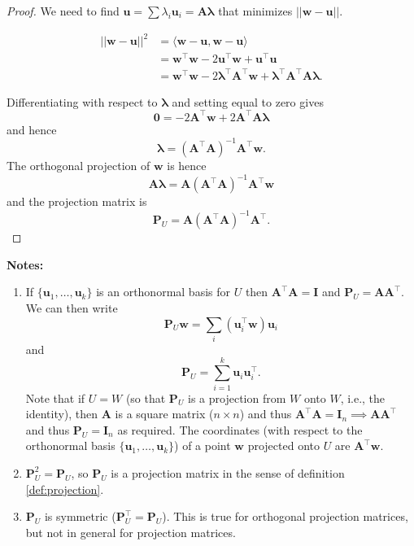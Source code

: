 \documentclass[
]{book}
\theoremstyle{definition}
\theoremstyle{definition}
\theoremstyle{definition}
\theoremstyle{definition}
\theoremstyle{remark}
\begin{document}
\begin{proof}
We need to find \(\mathbf u= \sum \lambda_i \mathbf u_i = \mathbf A\boldsymbol \lambda\) that minimizes \(||\mathbf w-\mathbf u||\).

\begin{align*}
||\mathbf w-\mathbf u||^2 &= \langle \mathbf w-\mathbf u, \mathbf w-\mathbf u\rangle\\
&= \mathbf w^\top \mathbf w- 2\mathbf u^\top \mathbf w+ \mathbf u^\top \mathbf u\\
&= \mathbf w^\top \mathbf w-2\boldsymbol \lambda^\top \mathbf A^\top \mathbf w+ \boldsymbol \lambda^\top \mathbf A^\top \mathbf A\boldsymbol \lambda.
\end{align*}

Differentiating with respect to \(\boldsymbol \lambda\) and setting equal to zero gives
\[{\boldsymbol 0}=-2 \mathbf A^\top \mathbf w+2 \mathbf A^\top \mathbf A\boldsymbol \lambda\]
and hence
\[ \boldsymbol \lambda= (\mathbf A^\top \mathbf A)^{-1}\mathbf A^\top \mathbf w.\]
The orthogonal projection of \(\mathbf w\) is hence
\[ \mathbf A\boldsymbol \lambda= \mathbf A(\mathbf A^\top \mathbf A)^{-1}\mathbf A^\top \mathbf w\]
and the projection matrix is
\[\mathbf P_U = \mathbf A(\mathbf A^\top \mathbf A)^{-1}\mathbf A^\top. \]
\end{proof}

\textbf{Notes:}

\begin{enumerate}
\def\labelenumi{\arabic{enumi}.}
\item
  If \(\{\mathbf u_1, \ldots, \mathbf u_k\}\) is an orthonormal basis for \(U\) then \(\mathbf A^\top \mathbf A= \mathbf I\) and \(\mathbf P_U = \mathbf A\mathbf A^\top\). We can then write
  \[\mathbf P_U\mathbf w= \sum_i (\mathbf u_i^\top \mathbf w) \mathbf u_i\]
  and
  \[\mathbf P_U = \sum_{i=1}^k \mathbf u_i\mathbf u_i^\top.\]
  Note that if \(U=W\) (so that \(\mathbf P_U\) is a projection from \(W\) onto \(W\), i.e., the identity), then \(\mathbf A\) is a square matrix (\(n\times n\)) and thus \(\mathbf A^\top\mathbf A=\mathbf I_n \implies \mathbf A\mathbf A^\top\) and thus \(\mathbf P_U=\mathbf I_n\) as required. The coordinates (with respect to the orthonormal basis \(\{\mathbf u_1, \ldots, \mathbf u_k\}\)) of a point \(\mathbf w\) projected onto \(U\) are \(\mathbf A^\top \mathbf w\).
\item
  \(\mathbf P_U^2=\mathbf P_U\), so \(\mathbf P_U\) is a projection matrix in the sense of definition \ref{def:projection}.
\item
  \(\mathbf P_U\) is symmetric (\(\mathbf P_U^\top=\mathbf P_U\)). This is true for orthogonal projection matrices, but not in general for projection matrices.
\end{enumerate}
\end{document}
